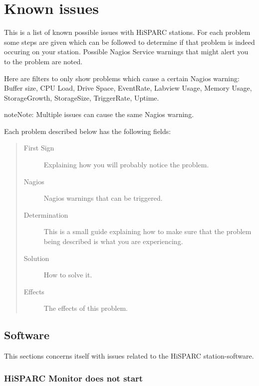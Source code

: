 \documentclass[a4paper,11pt,english]{sphinxmanual}
\begin{document}
\chapter{Known issues}
\label{known-issues:known-issues}\label{known-issues::doc}
This is a list of known possible issues with HiSPARC stations. For each problem some steps are given which can be followed to determine if that problem is indeed occuring on your station. Possible Nagios Service warnings that might alert you to the problem are noted.

Here are filters to only show problems which cause a certain Nagios warning:
Buffer size,
CPU Load,
Drive Space,
EventRate,
Labview Usage,
Memory Usage,
StorageGrowth,
StorageSize,
TriggerRate,
Uptime.

\begin{notice}{note}{Note:}
Multiple issues can cause the same Nagios warning.
\end{notice}

Each problem described below has the following fields:
\begin{quote}\begin{description}
\item[{First Sign}] \leavevmode
Explaining how you will probably notice the problem.

\item[{Nagios}] \leavevmode
Nagios warnings that can be triggered.

\item[{Determination}] \leavevmode
This is a small guide explaining how to make sure that the problem being described is what you are experiencing.

\item[{Solution}] \leavevmode
How to solve it.

\item[{Effects}] \leavevmode
The effects of this problem.

\end{description}\end{quote}


\section{Software}
\label{known-issues:software}
This sections concerns itself with issues related to the HiSPARC
station-software.


\subsection{HiSPARC Monitor does not start}
\label{known-issues:hisparc-monitor-does-not-start}
\end{document}
